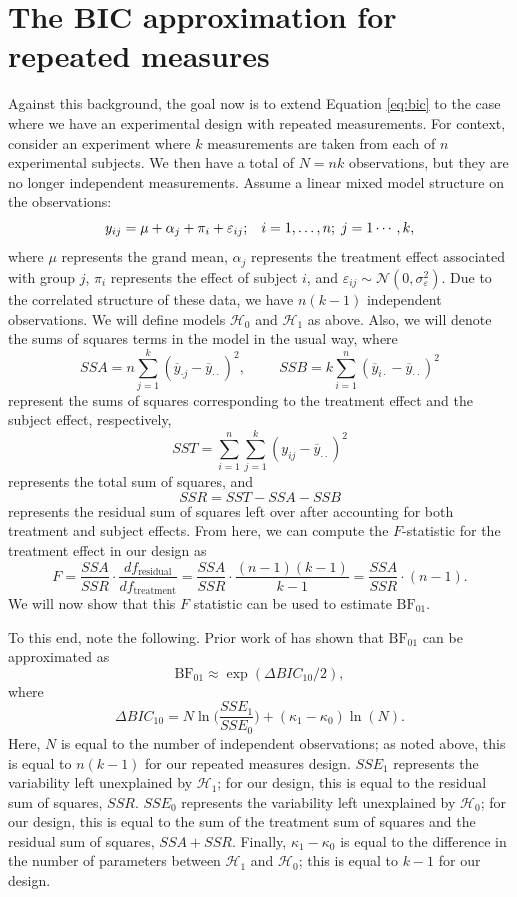 \documentclass[12pt,twoside,a4paper]{article}
\begin{document}
\section{The BIC approximation for repeated measures}

Against this background, the goal now is to extend Equation \ref{eq:bic} to the case where we have an experimental design with repeated measurements. For context, consider an experiment where $k$ measurements are taken from each of $n$ experimental subjects. We then have a total of $N=nk$ observations, but they are no longer independent measurements. Assume a linear mixed model structure on the observations:%
\[
  y_{ij} = \mu + \alpha_j + \pi_i + \varepsilon_{ij}; \hspace{3mm} i=1,\dots,n;\hspace{1mm}j=1\cdots,k,
\]%
where $\mu$ represents the grand mean, $\alpha_j$ represents the treatment effect associated with group $j$, $\pi_i$ represents the effect of subject $i$, and $\varepsilon_{ij} \sim \mathcal{N}(0,\sigma_{\varepsilon}^2)$. Due to the correlated structure of these data, we have $n(k-1)$ independent observations.  We will define models $\mathcal{H}_0$ and $\mathcal{H}_1$ as above. Also, we will denote the sums of squares terms in the model in the usual way, where%
\[
  SSA = n\sum_{j=1}^k(\overline{y}_{\cdot j}-\overline{y}_{\cdot \cdot})^2, \hspace{1cm}SSB = k\sum_{i=1}^n(\overline{y}_{i\cdot}-\overline{y}_{\cdot \cdot})^2
\]%
represent the sums of squares corresponding to the treatment effect and the subject effect, respectively,%
\[
  SST = \sum_{i=1}^n \sum_{j=1}^k (y_{ij} - \overline{y}_{\cdot \cdot})^2
\]%
represents the total sum of squares, and%
\[
  SSR = SST - SSA - SSB
\]%
represents the residual sum of squares left over after accounting for both treatment and subject effects. From here, we can compute the $F$-statistic for the treatment effect in our design as%
\[
  F=\frac{SSA}{SSR}\cdot \frac{df_{\text{residual}}}{df_{\text{treatment}}} = \frac{SSA}{SSR}\cdot \frac{(n-1)(k-1)}{k-1} = \frac{SSA}{SSR}\cdot (n-1).
    \]%
We will now show that this $F$ statistic can be used to estimate $\text{BF}_{01}$. 
    
To this end, note the following. Prior work of \citet{wagenmakers2007} has shown that $\text{BF}_{01}$ can be approximated as%
\[
  \text{BF}_{01} \approx \exp(\Delta BIC_{10}/2),
\]%
where%
\[
  \Delta BIC_{10} = N\ln \Biggl(\frac{SSE_1}{SSE_0}\Biggr) + (\kappa_1-\kappa_0)\ln(N).
\]%
Here, $N$ is equal to the number of independent observations; as noted above, this is equal to $n(k-1)$ for our repeated measures design. $SSE_1$ represents the variability left unexplained by $\mathcal{H}_1$; for our design, this is equal to the residual sum of squares, $SSR$. $SSE_0$ represents the variability left unexplained by $\mathcal{H}_0$; for our design, this is equal to the sum of the treatment sum of squares and the residual sum of squares, $SSA+SSR$. Finally, $\kappa_1-\kappa_0$ is equal to the difference in the number of parameters between $\mathcal{H}_1$ and $\mathcal{H}_0$; this is equal to $k-1$ for our design. 
\end{document}
